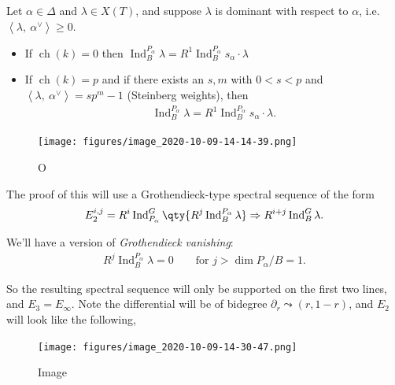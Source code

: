 \begin{corollary}[?]

Let \(\alpha\in \Delta\) and \(\lambda\in X(T)\), and suppose
\(\lambda\) is dominant with respect to \(\alpha\),
i.e.~\({\left\langle {\lambda},~{\alpha^\vee} \right\rangle} \geq 0\).

\begin{itemize}
\item
  If \(\operatorname{ch}(k) = 0\) then
  \(\operatorname{Ind}_B^{P_\alpha}\lambda = R^1 \operatorname{Ind}_B^{P_\alpha} s_\alpha \cdot \lambda\)
\item
  If \(\operatorname{ch}(k) = p\) and if there exists an \(s, m\) with
  \(0<s<p\) and
  \({\left\langle {\lambda},~{\alpha^\vee} \right\rangle} = sp^m - 1\)
  (Steinberg weights), then
  \begin{align*}  
  \operatorname{Ind}_B^{P_\alpha} \lambda = R^1 \operatorname{Ind}_B^{P_\alpha} s_\alpha \cdot \lambda
  .\end{align*}
\end{itemize}

\begin{figure}
\centering
\texttt{[image: figures/image\_2020-10-09-14-14-39.png]}
\caption{O}
\end{figure}

\end{corollary}

The proof of this will use a Grothendieck-type spectral sequence of the
form
\begin{align*}  
E_2^{i, j} = R^i \operatorname{Ind}_{P_\alpha}^G \qty{ R^j \operatorname{Ind}_B^{P_\alpha} \lambda} \Rightarrow R^{i+j} \operatorname{Ind}_B^G \lambda
.\end{align*}

We'll have a version of \emph{Grothendieck vanishing}:
\begin{align*}  
R^j \operatorname{Ind}_B^{P_\alpha} \lambda = 0 \qquad\text{for } j > \dim P_\alpha/B = 1
.\end{align*}

So the resulting spectral sequence will only be supported on the first
two lines, and \(E_3 = E_\infty\). Note the differential will be of
bidegree \({\partial}_r \leadsto (r, 1-r)\), and \(E_2\) will look like
the following,

\begin{figure}
\centering
\texttt{[image: figures/image\_2020-10-09-14-30-47.png]}
\caption{Image}
\end{figure}

